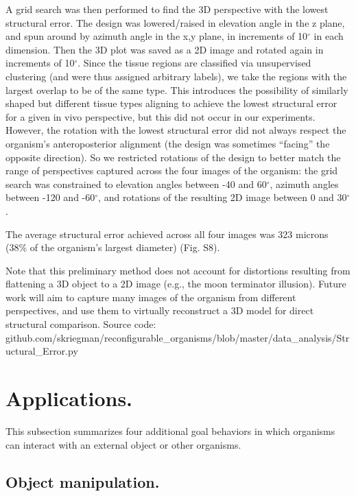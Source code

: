 A grid search was then performed to find the 3D perspective with the lowest structural error. The design was lowered/raised in elevation angle in the z plane, and spun around by azimuth angle in the x,y plane, in increments of 10{$^{\circ}$} in each dimension. Then the 3D plot was saved as a 2D image and rotated again in increments of 10{$^{\circ}$}. 
Since the tissue regions are classified via unsupervised clustering (and were thus assigned arbitrary labels), we take the regions with the largest overlap to be of the same type. This introduces the possibility of similarly shaped but different tissue types aligning to achieve the lowest structural error for a given in vivo perspective, but this did not occur in our experiments. However, the rotation with the lowest structural error did not always respect the organism's anteroposterior alignment (the design was sometimes ``facing'' the opposite direction). So we restricted rotations of the design to better match the range of perspectives captured across the four images of the organism: the grid search was constrained to elevation angles between -40 and 60{$^{\circ}$}, azimuth angles between -120 and -60{$^{\circ}$}, and rotations of the resulting 2D image between 0 and 30{$^{\circ}$}.

The average structural error achieved across all four images was 323 microns (38\% of the organism's largest diameter) (Fig. S8). 

Note that this preliminary method does not account for distortions resulting from flattening a 3D object to a 2D image (e.g., the moon terminator illusion). Future work will aim to capture many images of the organism from different perspectives, and use them to virtually reconstruct a 3D model for direct structural comparison. Source code: github.com/skriegman/reconfigurable\_organisms/blob/master/data\_analysis/Structural\_Error.py


\section*{Applications.}

This subsection summarizes four additional goal behaviors in which organisms can interact with an external object or other organisms.

\subsection*{Object manipulation.}

